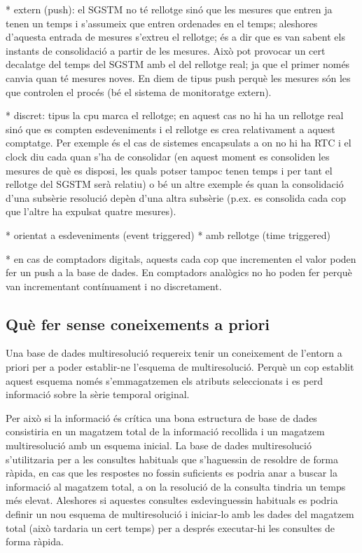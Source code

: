 * extern (push): el SGSTM no té rellotge sinó que les mesures que entren ja tenen un temps i s'assumeix que entren ordenades en el temps; aleshores d'aquesta entrada de mesures s'extreu el rellotge; és a dir que es van sabent els instants de consolidació a partir de les mesures. Això pot provocar un cert decalatge del temps del SGSTM amb el del rellotge real; ja que el primer només canvia quan té mesures noves. En diem de tipus push perquè les mesures són les que controlen el procés (bé el sistema de monitoratge extern). 

* discret: tipus la cpu marca el rellotge; en aquest cas no hi ha un rellotge real sinó que es compten esdeveniments i el rellotge es crea relativament a aquest comptatge. Per exemple és el cas de sistemes encapsulats a on no hi ha RTC i el clock diu cada quan s'ha de consolidar (en aquest moment es consoliden les mesures de què es disposi, les quals potser tampoc tenen temps i per tant el rellotge del SGSTM serà relatiu) o bé un altre exemple és quan la consolidació d'una subsèrie resolució depèn d'una altra subsèrie (p.ex. es consolida cada cop que l'altre ha expulsat quatre mesures).




\todo{}
* orientat a esdeveniments (event triggered)
* amb rellotge (time triggered)

* en cas de comptadors digitals, aquests cada cop que incrementen el valor poden fer un push a la base de dades. En comptadors analògics no ho poden fer perquè van incrementant contínuament i no discretament.

\subsection{Què fer sense coneixements a priori}

Una base de dades multiresolució requereix tenir un coneixement de l'entorn a priori per a poder establir-ne l'esquema de multiresolució. Perquè un cop establit aquest esquema només s'emmagatzemen els atributs seleccionats i es perd informació sobre la sèrie temporal original.

Per això si la informació és crítica una bona estructura de base de dades consistiria en un magatzem total de la informació recollida i un magatzem multiresolució amb un esquema inicial. La base de dades multiresolució s'utilitzaria per a les consultes habituals que s'haguessin de resoldre de forma ràpida, en cas que les respostes no fossin suficients es podria anar a buscar la informació al magatzem total, a on la resolució de la consulta tindria un temps més elevat. 
Aleshores si aquestes consultes esdevinguessin habituals es podria definir un nou esquema de multiresolució i iniciar-lo amb les dades del magatzem total (això tardaria un cert temps) per a després executar-hi les consultes de forma ràpida.


